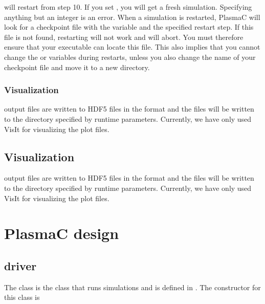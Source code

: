 \documentclass[letterpaper,10pt,english]{sphinxmanual}
\begin{document}
will restart from step 10. If you set , you will get a fresh simulation. Specifying anything but an integer is an error. When a simulation is restarted, PlasmaC will look for a checkpoint file with the  variable and the specified restart step. If this file is not found, restarting will not work and  will abort. You must therefore ensure that your executable can locate this file. This also implies that you cannot change the  or  variables during restarts, unless you also change the name of your checkpoint file and move it to a new directory.


\subsection{Visualization}
\label{\detokenize{Control:visualization}}
 output files are written to HDF5 files in the format  and the files will be written to the directory specified by {\hyperref[\detokenize{Driver:chap-driver}]{}} runtime parameters. Currently, we have only used VisIt for visualizing the plot files.


\section{Visualization}
\label{\detokenize{Visualization:visualization}}\label{\detokenize{Visualization:chap-visualization}}\label{\detokenize{Visualization::doc}}
 output files are written to HDF5 files in the format  and the files will be written to the directory specified by {\hyperref[\detokenize{Driver:chap-driver}]{}} runtime parameters. Currently, we have only used VisIt for visualizing the plot files.


\chapter{PlasmaC design}
\label{\detokenize{index:plasmac-design}}

\section{driver}
\label{\detokenize{Driver:driver}}\label{\detokenize{Driver:chap-driver}}\label{\detokenize{Driver::doc}}
The  class is the class that runs  simulations and is defined in .
The constructor for this class is
\end{document}
